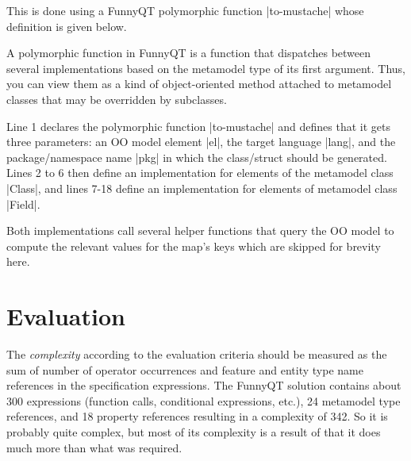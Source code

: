 \documentclass[submission]{eptcs}
\newcommand{\code}{\clojureinline}
\begin{document}
This is done using a FunnyQT polymorphic function \code|to-mustache| whose
definition is given below.


A polymorphic function in FunnyQT is a function that dispatches between several
implementations based on the metamodel type of its first argument.  Thus, you
can view them as a kind of object-oriented method attached to metamodel classes
that may be overridden by subclasses.

Line 1 declares the polymorphic function \code|to-mustache| and defines that it
gets three parameters: an OO model element \code|el|, the target language
\code|lang|, and the package/namespace name \code|pkg| in which the
class/struct should be generated.  Lines 2 to 6 then define an implementation
for elements of the metamodel class \code|Class|, and lines 7-18 define an
implementation for elements of metamodel class \code|Field|.

Both implementations call several helper functions that query the OO model to
compute the relevant values for the map's keys which are skipped for brevity
here.


\section{Evaluation}
\label{sec:evaluation}

The \emph{complexity} according to the evaluation criteria should be measured
as the sum of number of operator occurrences and feature and entity type name
references in the specification expressions.  The FunnyQT solution contains
about 300 expressions (function calls, conditional expressions, etc.), 24
metamodel type references, and 18 property references resulting in a complexity
of 342.  So it is probably quite complex, but most of its complexity is a
result of that it does much more than what was required.
\end{document}
